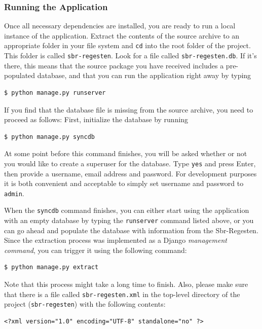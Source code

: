 \subsubsection{Running the Application}
\label{sec:run}

Once all necessary dependencies are installed, you are ready to run a
local instance of the application. Extract the contents of the source
archive to an appropriate folder in your file system and \texttt{cd}
into the root folder of the project. This folder is called
\texttt{sbr-regesten}. Look for a file called
\texttt{sbr-regesten.db}. If it's there, this means that the source
package you have received includes a pre-populated database, and that
you can run the application right away by typing

\begin{verbatim}
$ python manage.py runserver
\end{verbatim}

If you find that the database file is missing from the source archive,
you need to proceed as follows: First, initialize the database by running

\begin{verbatim}
$ python manage.py syncdb
\end{verbatim}

At some point before this command finishes, you will be asked whether
or not you would like to create a superuser for the database. Type
\texttt{yes} and press Enter, then provide a username, email address
and password. For development purposes it is both convenient and
acceptable to simply set username and password to \texttt{admin}.

When the \texttt{syncdb} command finishes, you can either start using
the application with an empty database by typing the
\texttt{runserver} command listed above, or you can go ahead and
populate the database with information from the Sbr-Regesten. Since
the extraction process was implemented as a Django \emph{management command},
you can trigger it using the following command:

\begin{verbatim}
$ python manage.py extract
\end{verbatim}

Note that this process might take a long time to finish. Also, please
make sure that there is a file called \texttt{sbr-regesten.xml} in the
top-level directory of the project (\texttt{sbr-regesten}) with the
following contents:

\begin{verbatim}
<?xml version="1.0" encoding="UTF-8" standalone="no" ?>

\end{verbatim}

